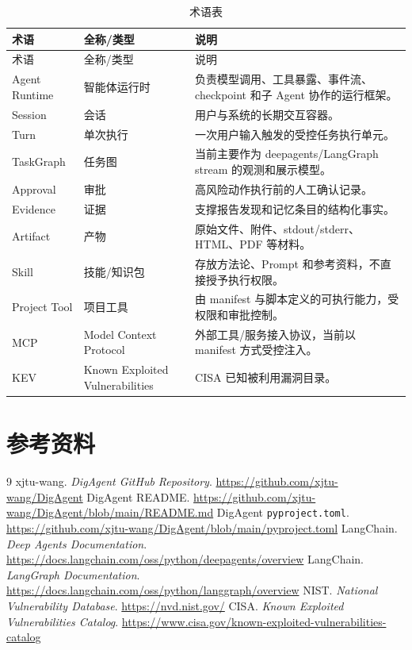 \documentclass[UTF8,zihao=-4,a4paper,fontset=none]{ctexart}
\newcommand{\code}[1]{\texttt{\footnotesize #1}}
\begin{document}
\begin{longtable}{p{}p{}p{}}
\caption{术语表}\label{tab:terms}\\
\toprule
术语 & 全称/类型 & 说明 \\
\midrule
\endfirsthead
\toprule
术语 & 全称/类型 & 说明 \\
\midrule
\endhead
Agent Runtime & 智能体运行时 & 负责模型调用、工具暴露、事件流、checkpoint 和子 Agent 协作的运行框架。 \\
Session & 会话 & 用户与系统的长期交互容器。 \\
Turn & 单次执行 & 一次用户输入触发的受控任务执行单元。 \\
TaskGraph & 任务图 & 当前主要作为 deepagents/LangGraph stream 的观测和展示模型。 \\
Approval & 审批 & 高风险动作执行前的人工确认记录。 \\
Evidence & 证据 & 支撑报告发现和记忆条目的结构化事实。 \\
Artifact & 产物 & 原始文件、附件、stdout/stderr、HTML、PDF 等材料。 \\
Skill & 技能/知识包 & 存放方法论、Prompt 和参考资料，不直接授予执行权限。 \\
Project Tool & 项目工具 & 由 manifest 与脚本定义的可执行能力，受权限和审批控制。 \\
MCP & Model Context Protocol & 外部工具/服务接入协议，当前以 manifest 方式受控注入。 \\
KEV & Known Exploited Vulnerabilities & CISA 已知被利用漏洞目录。 \\
\bottomrule
\end{longtable}

\section{参考资料}

\begin{thebibliography}{9}
 xjtu-wang. \textit{DigAgent GitHub Repository}. \url{https://github.com/xjtu-wang/DigAgent}
 DigAgent README. \url{https://github.com/xjtu-wang/DigAgent/blob/main/README.md}
 DigAgent \code{pyproject.toml}. \url{https://github.com/xjtu-wang/DigAgent/blob/main/pyproject.toml}
 LangChain. \textit{Deep Agents Documentation}. \url{https://docs.langchain.com/oss/python/deepagents/overview}
 LangChain. \textit{LangGraph Documentation}. \url{https://docs.langchain.com/oss/python/langgraph/overview}
 NIST. \textit{National Vulnerability Database}. \url{https://nvd.nist.gov/}
 CISA. \textit{Known Exploited Vulnerabilities Catalog}. \url{https://www.cisa.gov/known-exploited-vulnerabilities-catalog}
\end{thebibliography}
\end{document}
